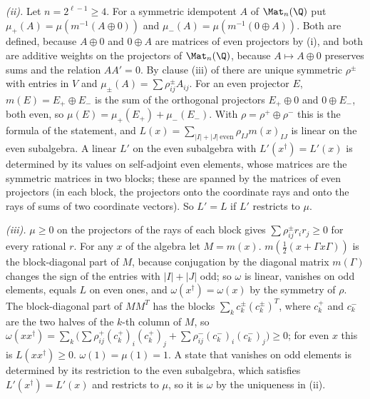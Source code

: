 \emph{(ii).} Let $n = 2^{\ell-1} \ge 4$. For a symmetric idempotent $A$ of $\Mat_{n}(\Q)$ put $\mu_{+}(A) = \mu(m^{-1}(A \oplus 0))$ and $\mu_{-}(A) = \mu(m^{-1}(0 \oplus A))$. Both are defined, because $A \oplus 0$ and $0 \oplus A$ are matrices of even projectors by (i), and both are additive weights on the projectors of $\Mat_{n}(\Q)$, because $A \mapsto A \oplus 0$ preserves sums and the relation $AA' = 0$. By clause (iii) of  there are unique symmetric $\rho^{\pm}$ with entries in $V$ and $\mu_{\pm}(A) = \sum\rho^{\pm}_{ij}A_{ij}$. For an even projector $E$, $m(E) = E_{+} \oplus E_{-}$ is the sum of the orthogonal projectors $E_{+} \oplus 0$ and $0 \oplus E_{-}$, both even, so $\mu(E) = \mu_{+}(E_{+}) + \mu_{-}(E_{-})$. With $\rho = \rho^{+} \oplus \rho^{-}$ this is the formula of the statement, and $L(x) = \sum_{|I| + |J|\ \mathrm{even}}\rho_{IJ}m(x)_{IJ}$ is linear on the even subalgebra. A linear $L'$ on the even subalgebra with $L'(x^{\dagger}) = L'(x)$ is determined by its values on self-adjoint even elements, whose matrices are the symmetric matrices in two blocks; these are spanned by the matrices of even projectors (in each block, the projectors onto the coordinate rays and onto the rays of sums of two coordinate vectors). So $L' = L$ if $L'$ restricts to $\mu$.

\emph{(iii).} $\mu \ge 0$ on the projectors of the rays of each block gives $\sum\rho^{\pm}_{ij}r_{i}r_{j} \ge 0$ for every rational $r$. For any $x$ of the algebra let $M = m(x)$. $m(\tfrac12(x + \Gamma x\Gamma))$ is the block-diagonal part of $M$, because conjugation by the diagonal matrix $m(\Gamma)$ changes the sign of the entries with $|I| + |J|$ odd; so $\omega$ is linear, vanishes on odd elements, equals $L$ on even ones, and $\omega(x^{\dagger}) = \omega(x)$ by the symmetry of $\rho$. The block-diagonal part of $MM^{T}$ has the blocks $\sum_{k}c^{\pm}_{k}(c^{\pm}_{k})^{T}$, where $c^{+}_{k}$ and $c^{-}_{k}$ are the two halves of the $k$-th column of $M$, so $\omega(xx^{\dagger}) = \sum_{k}\bigl(\sum\rho^{+}_{ij}(c^{+}_{k})_{i}(c^{+}_{k})_{j} + \sum\rho^{-}_{ij}(c^{-}_{k})_{i}(c^{-}_{k})_{j}\bigr) \ge 0$; for even $x$ this is $L(xx^{\dagger}) \ge 0$. $\omega(1) = \mu(1) = 1$. A state that vanishes on odd elements is determined by its restriction to the even subalgebra, which satisfies $L'(x^{\dagger}) = L'(x)$ and restricts to $\mu$, so it is $\omega$ by the uniqueness in (ii).

